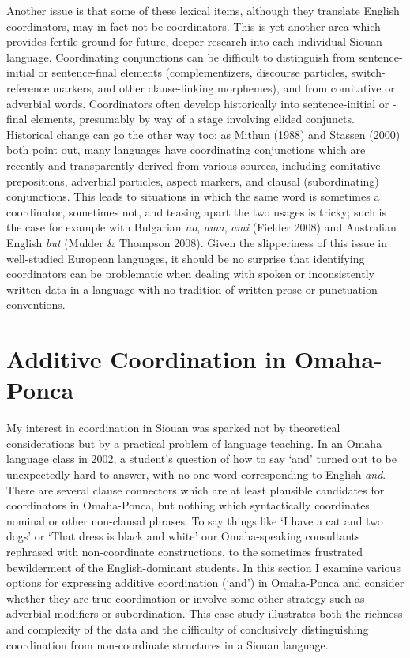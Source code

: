 \documentclass[output=paper]{LSP/langsci}
\begin{document}
Another issue is that some of these lexical items, although they translate English coordinators, may in fact not be coordinators. This is yet another area which provides fertile ground for future, deeper research into each individual Siouan language. Coordinating conjunctions can be difficult to distinguish from sentence-initial or sentence-final elements (complementizers, discourse particles, switch-reference markers, and other clause-linking morphemes), and from comitative or adverbial words. Coordinators often develop historically into sentence-initial or -final elements, presumably by way of a stage involving elided conjuncts. Historical change can go the other way too: as Mithun (1988) and Stassen (2000) both point out, many languages have coordinating conjunctions which are recently and transparently derived from various sources, including comitative prepositions, adverbial particles, aspect markers, and clausal (subordinating) conjunctions. This leads to situations in which the same word is sometimes a coordinator, sometimes not, and teasing apart the two usages is tricky; such is the case for example with Bulgarian \textit{no}, \textit{ama}, \textit{ami} (Fielder 2008) and Australian English \textit{but} (Mulder \& Thompson 2008). Given the slipperiness of this issue in well-studied European languages, it should be no surprise that identifying coordinators can be problematic when dealing with spoken or inconsistently written data in a language with no tradition of written prose or punctuation conventions.

\section{Additive Coordination in Omaha-Ponca}

My interest in coordination in Siouan was sparked not by theoretical considerations but by a practical problem of language teaching. In an Omaha language class in 2002, a student's question of how to say `and' turned out to be unexpectedly hard to answer, with no one word corresponding to English \textit{and}. There are several clause connectors which are at least plausible candidates for coordinators in Omaha-Ponca, but nothing which syntactically coordinates nominal or other non-clausal phrases. To say things like `I have a cat and two dogs' or `That dress is black and white' our Omaha-speaking consultants rephrased with non-coordinate constructions, to the sometimes frustrated bewilderment of the English-dominant students.  In this section I examine various options for expressing additive coordination (`and') in Omaha-Ponca and consider whether they are true coordination or involve some other strategy such as adverbial modifiers or subordination. This case study illustrates both the richness and complexity of the data and the difficulty of conclusively distinguishing coordination from non-coordinate structures in a Siouan language.
\end{document}
